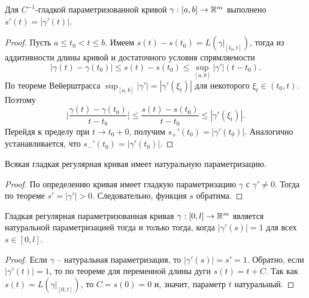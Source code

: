     \begin{theorem}
        Для $C^{-1}$-гладкой параметризованной кривой $\gamma: [a, b] \to \mathbb{R}^m$ выполнено $s'(t) = |\gamma'(t)|$.
    \end{theorem}
    
    \begin{proof}
        Пусть $a \leq t_{0} < t \leq b$. Имеем $s(t) - s(t_{0}) = L(\gamma|_{[t_{0}, t]})$, тогда из аддитивности длины кривой и достаточного условия спрямляемости
        \[|\gamma(t) - \gamma(t_{0})| \leq s(t) - s(t_{0}) \leq \sup_{[a, b]} |\gamma'|(t - t_{0}).\]
        По теореме Вейерштрасса $\sup_{[a, b]} |\gamma'| = |\gamma'(\xi_{t})|$ для некоторого $\xi_{t} \in (t_{0}, t)$. Поэтому 
        \[\lvert\frac{\gamma(t) - \gamma(t_{0})}{t - t_{0}}\rvert \leq \frac{s(t) - s(t_{0})}{t - t_{0}} \leq |\gamma'(\xi_{t})|.\]
        Перейдя к пределу при $t \to t_{0} + 0$, получим $s_{+}'(t_{0}) = |\gamma'(t_{0})|$. Аналогично устанавливается, что $s_{-}'(t_{0}) = |\gamma'(t_{0})|$.
    \end{proof}
    
    \begin{corollary}
        Всякая гладкая регулярная кривая имеет натуральную параметризацию.
    \end{corollary}
    
    \begin{proof}
        По определению кривая имеет гладкую параметризацию $\gamma$ с $\gamma' \neq 0$. Тогда по теореме $s' = |\gamma'| > 0$. Следовательно, функция $s$ обратима.
    \end{proof}
    
    \begin{corollary}
        Гладкая регулярная параметризованная кривая $\gamma: [0, l] \to \mathbb{R}^m$ является натуральной параметризацией тогда и только тогда, когда $|\gamma'(s)| = 1$ для всех $s \in [0, l]$.
    \end{corollary}
    
    \begin{proof}
        Если $\gamma$ -- натуральная параметризация, то $|\gamma'(s)| = s' = 1$. Обратно, если $|\gamma'(t)| = 1$, то по теореме для переменной длины дуги $s(t) = t + C$. Так как $s(t) = L(\gamma|_{[0, t]})$, то $C = s(0) = 0$ и, значит, параметр $t$ натуральный.
    \end{proof}